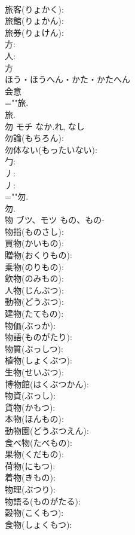 \documentclass[8pt]{extreport}
\begin{document}
\begin{CJK}{UTF8}{min}
\\	旅客(りょかく): 
\\	旅館(りょかん): 
\\	旅券(りょけん): 
\\	方: 
\\	人: 
\\	方	
\\	ほう・ほうへん・かた・かたへん	
\\	会意 
\\	=""旅.
\\	旅.
\\	勿	モチ	なか.れ, なし		
\\	勿論(もちろん): 
\\	勿体ない(もったいない): 
\\	勹: 
\\	丿: 
\\	丿: 
\\	=""勿.
\\	勿.
\\	物	ブツ、モツ	もの、もの-		
\\	物指(ものさし): 
\\	買物(かいもの): 
\\	贈物(おくりもの): 
\\	乗物(のりもの): 
\\	飲物(のみもの): 
\\	人物(じんぶつ): 
\\	動物(どうぶつ): 
\\	建物(たてもの): 
\\	物価(ぶっか): 
\\	物語(ものがたり): 
\\	物質(ぶっしつ): 
\\	植物(しょくぶつ): 
\\	生物(せいぶつ): 
\\	博物館(はくぶつかん): 
\\	物資(ぶっし): 
\\	貨物(かもつ): 
\\	本物(ほんもの): 
\\	動物園(どうぶつえん): 
\\	食べ物(たべもの): 
\\	果物(くだもの): 
\\	荷物(にもつ): 
\\	着物(きもの): 
\\	物理(ぶつり): 
\\	物語る(ものがたる): 
\\	穀物(こくもつ): 
\\	食物(しょくもつ): 

\end{CJK}
\end{document}
